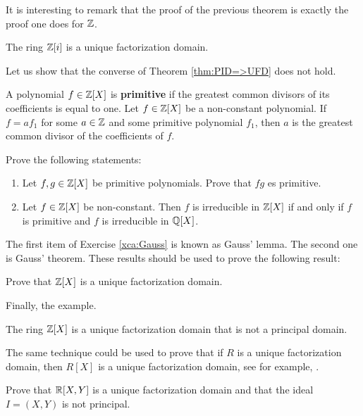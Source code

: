 It is interesting to remark that the proof 
of the previous theorem is exactly the proof
one does for $\mathbb{Z}$. 

\begin{example}
	The ring $\mathbb{Z}[i]$ is a unique factorization domain. 	
\end{example}

Let us show that the converse of Theorem \ref{thm:PID=>UFD} does not hold. 

\begin{exercise}
\label{xca:content}
	A polynomial $f\in\mathbb{Z}[X]$ is \textbf{primitive} if
	the greatest common divisors of its coefficients is equal to one. 
	Let $f\in\mathbb{Z}[X]$ be a non-constant polynomial. If $f=af_1$ for some $a\in\mathbb{Z}$ and some
	primitive polynomial $f_1$, then $a$ is the greatest common divisor of the coefficients of $f$. 	
\end{exercise}

\begin{exercise}
\label{xca:Gauss}
Prove the following statements:
\begin{enumerate}
    \item Let $f,g\in\mathbb{Z}[X]$ be primitive polynomials. Prove that $fg$ es primitive.
    \item Let $f\in\mathbb{Z}[X]$ be non-constant. Then
$f$ is irreducible in $\mathbb{Z}[X]$ if and only if $f$ is primitive and 
$f$ is irreducible in $\mathbb{Q}[X]$. 
\end{enumerate}
\end{exercise}

The first item of Exercise \ref{xca:Gauss} is known as Gauss' lemma.
The second one is Gauss' theorem. These results should be used to prove
the following result: 

\begin{exercise}
\label{xca:Z[X]_UFD}
    Prove that $\mathbb{Z}[X]$ is a unique factorization domain. 
\end{exercise}

Finally, the example. 

\begin{example}
	The ring $\mathbb{Z}[X]$ is a unique factorization 
	domain that is not a principal domain. 	
\end{example}

The same technique could be used to prove that if 
$R$ is a unique factorization domain, then $R[X]$ 
is a unique factorization domain, see
for example, \cite[Chapter III, Theorem 6.14]{MR600654}.  

\begin{exercise}
    Prove that $\mathbb{R}[X,Y]$ is a unique factorization domain 
    and that the ideal $I=(X,Y)$ is not principal. 
\end{exercise}

